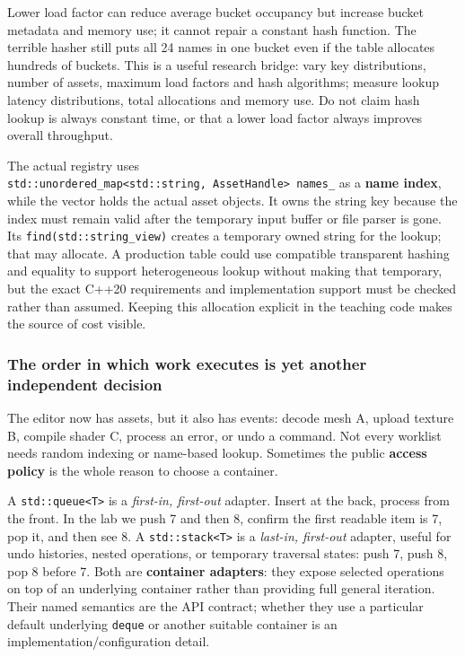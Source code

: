Lower load factor can reduce average bucket occupancy but increase bucket metadata and memory use; it cannot repair a constant hash function. The terrible hasher still puts all 24 names in one bucket even if the table allocates hundreds of buckets. This is a useful research bridge: vary key distributions, number of assets, maximum load factors and hash algorithms; measure lookup latency distributions, total allocations and memory use. Do not claim hash lookup is always constant time, or that a lower load factor always improves overall throughput.

The actual registry uses \texttt{std::unordered\_map\textless{}std::string,\ AssetHandle\textgreater{}\ names\_} as a \textbf{name index}, while the vector holds the actual asset objects. It owns the string key because the index must remain valid after the temporary input buffer or file parser is gone. Its \texttt{find(std::string\_view)} creates a temporary owned string for the lookup; that may allocate. A production table could use compatible transparent hashing and equality to support heterogeneous lookup without making that temporary, but the exact C++20 requirements and implementation support must be checked rather than assumed. Keeping this allocation explicit in the teaching code makes the source of cost visible.

\subsubsection{The order in which work executes is yet another independent decision}\label{the-order-in-which-work-executes-is-yet-another-independent-decision}

The editor now has assets, but it also has events: decode mesh A, upload texture B, compile shader C, process an error, or undo a command. Not every worklist needs random indexing or name-based lookup. Sometimes the public \textbf{access policy} is the whole reason to choose a container.

A \texttt{std::queue\textless{}T\textgreater{}} is a \emph{first-in, first-out} adapter. Insert at the back, process from the front. In the lab we push 7 and then 8, confirm the first readable item is 7, pop it, and then see 8. A \texttt{std::stack\textless{}T\textgreater{}} is a \emph{last-in, first-out} adapter, useful for undo histories, nested operations, or temporary traversal states: push 7, push 8, pop 8 before 7. Both are \textbf{container adapters}: they expose selected operations on top of an underlying container rather than providing full general iteration. Their named semantics are the API contract; whether they use a particular default underlying \texttt{deque} or another suitable container is an implementation/configuration detail.

